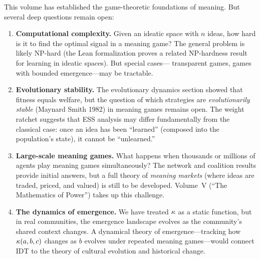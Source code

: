 \begin{remark}
This volume has established the game-theoretic foundations of meaning. But
several deep questions remain open:

\begin{enumerate}
\item \textbf{Computational complexity.} Given an ideatic space with $n$
ideas, how hard is it to find the optimal signal in a meaning game? The
general problem is likely NP-hard (the Lean formalization proves a related
NP-hardness result for learning in ideatic spaces). But special cases---
transparent games, games with bounded emergence---may be tractable.

\item \textbf{Evolutionary stability.} The evolutionary dynamics section
showed that fitness equals welfare, but the question of which strategies
are \emph{evolutionarily stable} (Maynard Smith 1982) in meaning games
remains open. The weight ratchet suggests that ESS analysis may differ
fundamentally from the classical case: once an idea has been ``learned''
(composed into the population's state), it cannot be ``unlearned.''

\item \textbf{Large-scale meaning games.} What happens when thousands or
millions of agents play meaning games simultaneously? The network and
coalition results provide initial answers, but a full theory of
\emph{meaning markets} (where ideas are traded, priced, and valued) is
still to be developed. Volume~V (``The Mathematics of Power'') takes up
this challenge.

\item \textbf{The dynamics of emergence.} We have treated $\kappa$ as
a static function, but in real communities, the emergence landscape
evolves as the community's shared context changes. A dynamical theory
of emergence---tracking how $\kappa(a, b, c)$ changes as $b$ evolves
under repeated meaning games---would connect IDT to the theory of
cultural evolution and historical change.
\end{enumerate}
\end{remark}
